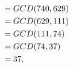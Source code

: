 \documentclass[11pt]{article}
\begin{document}
\begin{enumerate}[7.1]
\begin{enumerate}
\begin{align*}
      =\hspace{0.25em} & GCD(740, 629)   & \\
      =\hspace{0.25em} & GCD(629, 111)   & \\
      =\hspace{0.25em} & GCD(111, 74)    & \\
      =\hspace{0.25em} & GCD(74, 37)     & \\
      =\hspace{0.25em} & 37.
    \end{align*}
  \end{enumerate}
\end{enumerate}
\end{document}
